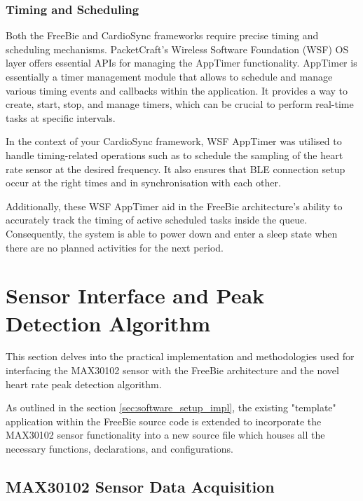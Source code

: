 \subsubsection{Timing and Scheduling}
\label{sec:wsf_apptimer}
Both the FreeBie and CardioSync frameworks require precise timing and scheduling mechanisms. PacketCraft's Wireless Software Foundation (WSF) OS layer offers essential APIs for managing the AppTimer functionality. AppTimer is essentially a timer management module that allows to schedule and manage various timing events and callbacks within the application. It provides a way to create, start, stop, and manage timers, which can be crucial to perform real-time tasks at specific intervals.
\vspace{1\baselineskip}

\noindent In the context of your CardioSync framework, WSF AppTimer was utilised to handle timing-related operations such as to schedule the sampling of the heart rate sensor at the desired frequency. It also ensures that BLE connection setup occur at the right times and in synchronisation with each other. 
\vspace{1\baselineskip}

\noindent Additionally, these WSF AppTimer aid in the FreeBie architecture's ability to accurately track the timing of active scheduled tasks inside the queue. Consequently, the system is able to power down and enter a sleep state when there are no planned activities for the next period. 


\section{Sensor Interface and Peak Detection Algorithm}
\label{sec:sensor_data_impl}
This section delves into the practical implementation and methodologies used for interfacing the MAX30102 sensor with the FreeBie architecture and the novel heart rate peak detection algorithm.
\vspace{1\baselineskip}

\noindent As outlined in the section \ref{sec:software_setup_impl}, the existing "template" application within the FreeBie source code is extended to incorporate the MAX30102 sensor functionality into a new source file which houses all the necessary functions, declarations, and configurations.

\subsection{MAX30102 Sensor Data Acquisition}

